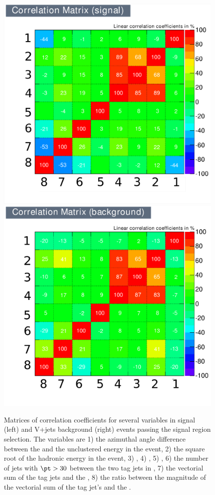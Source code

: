 \begin{figure}
  \includegraphics[width=.65\largefigwidth]{plots/parked/AN-14-243-figs/inputcorrsig.pdf}
  \includegraphics[width=.65\largefigwidth]{plots/parked/AN-14-243-figs/inputcorrbkg.pdf}
  \caption{Matrices of correlation coefficients for several variables in signal (left) and V+jets background (right) events passing the signal region selection. The variables are 1) the azimuthal angle difference between the \METnoMU and the unclustered energy in the event, 2) the square root of the hadronic energy in the event, 3) \METsig, 4) \METnoMU, 5) \Mjj, 6) the number of jets with $\pt>30$ \GeV between the two tag jets in \eta, 7) the vectorial sum of the tag jets \pt and the \METnoMU, 8) the ratio between the magnitude of the vectorial sum of the tag jet's \pt and the \METnoMU.}
  \label{fig:parkedmvacorr}
\end{figure}

